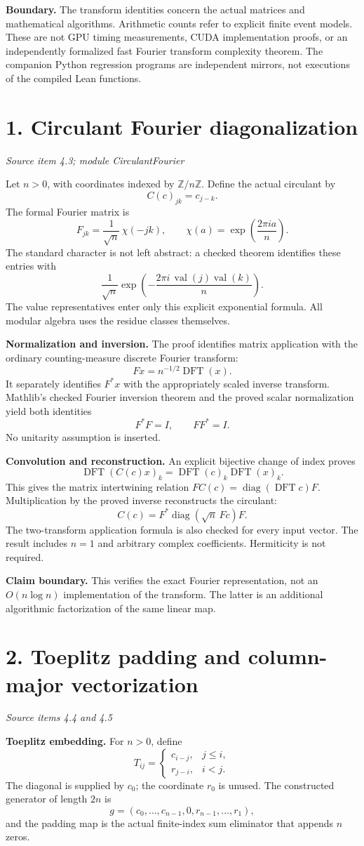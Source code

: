 \documentclass[11pt]{article}
\newcommand{\pageheading}[2]{\section*{\color{ink}#1}\textit{#2}\par}
\begin{document}
\textbf{Boundary.} The transform identities concern the actual matrices and mathematical algorithms. Arithmetic counts refer to explicit finite event models. These are not GPU timing measurements, CUDA implementation proofs, or an independently formalized fast Fourier transform complexity theorem. The companion Python regression programs are independent mirrors, not executions of the compiled Lean functions.

\newpage
\pageheading{1. Circulant Fourier diagonalization}{Source item 4.3; module CirculantFourier}
Let $n>0$, with coordinates indexed by $\mathbb Z/n\mathbb Z$. Define the actual circulant by
\[
C(c)_{jk}=c_{j-k}.
\]
The formal Fourier matrix is
\[
F_{jk}=\frac{1}{\sqrt n}\,\chi(-jk),
\qquad
\chi(a)=\exp\!\left(\frac{2\pi i a}{n}\right).
\]
The standard character is not left abstract: a checked theorem identifies these entries with
\[
\frac{1}{\sqrt n}\exp\!\left(-\frac{2\pi i\,\operatorname{val}(j)\operatorname{val}(k)}n\right).
\]
The value representatives enter only this explicit exponential formula. All modular algebra uses the residue classes themselves.

\textbf{Normalization and inversion.} The proof identifies matrix application with the ordinary counting-measure discrete Fourier transform:
\[
Fx=n^{-1/2}\operatorname{DFT}(x).
\]
It separately identifies $F^*x$ with the appropriately scaled inverse transform. Mathlib's checked Fourier inversion theorem and the proved scalar normalization yield both identities
\[
\boxed{F^*F=I,\qquad FF^*=I.}
\]
No unitarity assumption is inserted.

\textbf{Convolution and reconstruction.} An explicit bijective change of index proves
\[
\operatorname{DFT}(C(c)x)_k
=\operatorname{DFT}(c)_k\operatorname{DFT}(x)_k.
\]
This gives the matrix intertwining relation $FC(c)=\operatorname{diag}(\operatorname{DFT}c)F$. Multiplication by the proved inverse reconstructs the circulant:
\[
\boxed{C(c)=F^*\operatorname{diag}(\sqrt n\,Fc)F.}
\]
The two-transform application formula is also checked for every input vector. The result includes $n=1$ and arbitrary complex coefficients. Hermiticity is not required.

\textbf{Claim boundary.} This verifies the exact Fourier representation, not an $O(n\log n)$ implementation of the transform. The latter is an additional algorithmic factorization of the same linear map.

\newpage
\pageheading{2. Toeplitz padding and column-major vectorization}{Source items 4.4 and 4.5}
\textbf{Toeplitz embedding.} For $n>0$, define
\[
T_{ij}=
\begin{cases}
c_{i-j},&j\le i,\\
r_{j-i},&i<j.
\end{cases}
\]
The diagonal is supplied by $c_0$; the coordinate $r_0$ is unused. The constructed generator of length $2n$ is
\[
g=(c_0,\ldots,c_{n-1},0,r_{n-1},\ldots,r_1),
\]
and the padding map is the actual finite-index sum eliminator that appends $n$ zeros.
\end{document}
